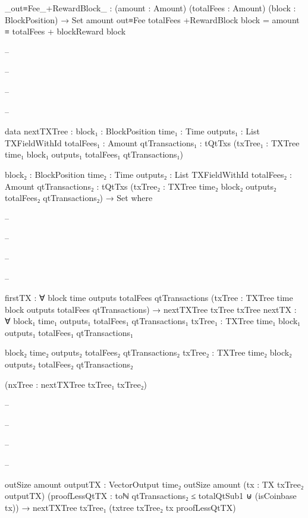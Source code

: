 \documentclass{beamer}
\begin{document}
{\begin{frame}
\begin{code}
        _out≡Fee_+RewardBlock_ : (amount : Amount)
          (totalFees : Amount)
          (block : BlockPosition) → Set
        amount out≡Fee totalFees +RewardBlock block =
          amount ≡ totalFees + blockReward block

-- \end{code}
-- \end{frame}
-- \begin{frame}
-- \begin{code}


      data nextTXTree :
        {block₁ : BlockPosition}
        {time₁ : Time}
        {outputs₁ : List TXFieldWithId}
        {totalFees₁ : Amount}
        {qtTransactions₁ : tQtTxs}
        (txTree₁ : TXTree time₁ block₁ outputs₁
          totalFees₁ qtTransactions₁)

        {block₂ : BlockPosition}
        {time₂ : Time}
        {outputs₂ : List TXFieldWithId}
        {totalFees₂ : Amount}
        {qtTransactions₂ : tQtTxs}
        (txTree₂ : TXTree time₂ block₂ outputs₂
          totalFees₂ qtTransactions₂)
        → Set where

-- \end{code}
-- \end{frame}
-- \begin{frame}
-- \begin{code}

        firstTX : ∀ {block time outputs totalFees qtTransactions}
          (txTree : TXTree time block outputs totalFees qtTransactions)
          → nextTXTree txTree txTree
        nextTX : ∀ {block₁ time₁ outputs₁ totalFees₁ qtTransactions₁}
          {txTree₁ : TXTree time₁ block₁
            outputs₁ totalFees₁ qtTransactions₁}

          {block₂ time₂ outputs₂ totalFees₂ qtTransactions₂}
          {txTree₂ : TXTree time₂ block₂
            outputs₂ totalFees₂ qtTransactions₂}

          (nxTree : nextTXTree txTree₁ txTree₂)

-- \end{code}
-- \end{frame}
-- \begin{frame}
-- \begin{code}

          {outSize amount}
          {outputTX : VectorOutput time₂ outSize amount}
          (tx : TX txTree₂ outputTX)
          (proofLessQtTX :
              toℕ qtTransactions₂ ≤ totalQtSub1
              ⊎
              (isCoinbase tx))
          → nextTXTree txTree₁ (txtree txTree₂ tx proofLessQtTX)


\end{code}
\end{frame}}
\end{document}
